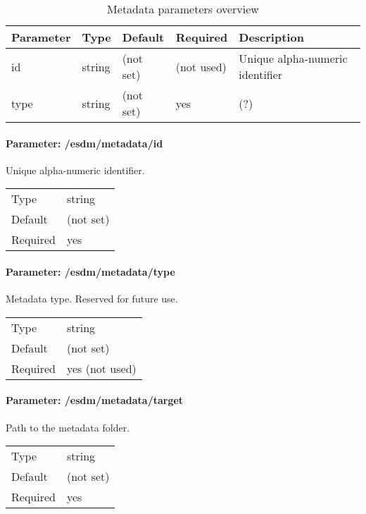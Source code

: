 \begin{preserve}
\begin{table}[!ht]
  \begin{center}
    \begin{tabularx}{\textwidth}{llllX}
      Parameter & Type   & Default   & Required   & Description                     \\ 
      \hline
      id        & string & (not set) & (not used) & Unique alpha-numeric identifier \\ 
      type      & string & (not set) & yes        & (?)                             \\ 
    \end{tabularx}
  \end{center}
  \caption{Metadata parameters overview}%
  \label{tab:metadata_params}
\end{table}
\end{preserve}

\paragraph{Parameter: /esdm/metadata/id}
Unique alpha-numeric identifier.

\begin{preserve}
 \noindent
 \begin{tabular}{ll}
   Type     & string    \\ 
   Default  & (not set) \\ 
   Required & yes       \\ 
 \end{tabular} 
\end{preserve}
\FloatBarrier
\vspace{\gapsize}

\paragraph{Parameter: /esdm/metadata/type}
Metadata type. Reserved for future use.

\begin{preserve}
  \noindent
  \begin{tabular}{ll}
    Type     & string         \\ 
    Default  & (not set)      \\ 
    Required & yes (not used) \\ 
  \end{tabular}
\end{preserve}
\FloatBarrier
\vspace{\gapsize}

\paragraph{Parameter: /esdm/metadata/target}
Path to the metadata folder.

\begin{preserve}
  \noindent
  \begin{tabular}{ll}
    Type     & string         \\ 
    Default  & (not set)      \\ 
    Required & yes \\ 
  \end{tabular}
\end{preserve}
\FloatBarrier
\vspace{\gapsize}
